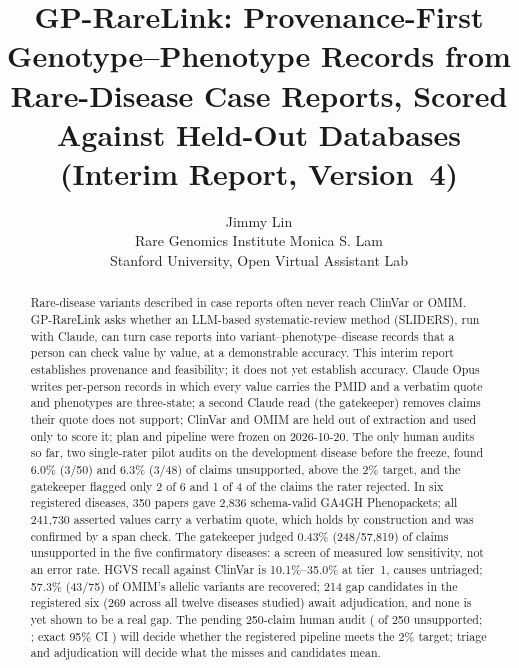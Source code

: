 \documentclass{article} %
\title{GP-RareLink: Provenance-First Genotype--Phenotype Records from Rare-Disease Case Reports, Scored Against Held-Out Databases (Interim Report, Version~4)}
\author{Jimmy Lin \\
Rare Genomics Institute
\And
Monica S. Lam \\
Stanford University, Open Virtual Assistant Lab
}
\begin{document}
\maketitle

\begin{abstract}
Rare-disease variants described in case reports often never reach ClinVar or OMIM. GP-RareLink asks whether an LLM-based systematic-review method (SLIDERS), run with Claude, can turn case reports into variant--phenotype--disease records that a person can check value by value, at a demonstrable accuracy. This interim report establishes provenance and feasibility; it does not yet establish accuracy. Claude Opus writes per-person records in which every value carries the PMID and a verbatim quote and phenotypes are three-state; a second Claude read (the gatekeeper) removes claims their quote does not support; ClinVar and OMIM are held out of extraction and used only to score it; plan and pipeline were frozen on 2026-10-20. The only human audits so far, two single-rater pilot audits on the development disease before the freeze, found 6.0\% (3/50) and 6.3\% (3/48) of claims unsupported, above the 2\% target, and the gatekeeper flagged only 2 of 6 and 1 of 4 of the claims the rater rejected. In six registered diseases, 350 papers gave 2,836 schema-valid GA4GH Phenopackets; all 241,730 asserted values carry a verbatim quote, which holds by construction and was confirmed by a span check. The gatekeeper judged 0.43\% (248/57,819) of claims unsupported in the five confirmatory diseases: a screen of measured low sensitivity, not an error rate. HGVS recall against ClinVar is 10.1\%--35.0\% at tier~1, causes untriaged; 57.3\% (43/75) of OMIM's allelic variants are recovered; 214 gap candidates in the registered six (269 across all twelve diseases studied) await adjudication, and none is yet shown to be a real gap. The pending 250-claim human audit ( of 250 unsupported; ; exact 95\% CI ) will decide whether the registered pipeline meets the 2\% target; triage and adjudication will decide what the misses and candidates mean.
\end{abstract}
\end{document}
